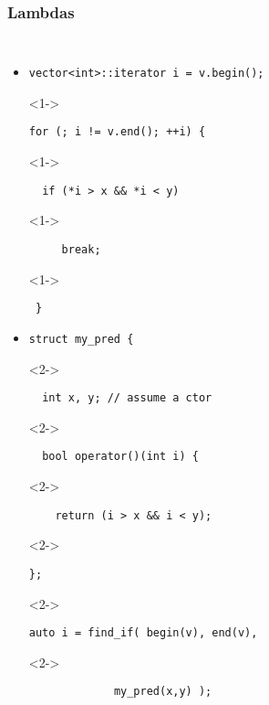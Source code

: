 
\begin{frame}[fragile]
\frametitle{Lambdas}
\begin{columns}[t]
\begin{itemize}
\item  <1->{\scriptsize\begin{verbatim}vector<int>::iterator i = v.begin();  \end{verbatim}}
\item[]<1->{\scriptsize\begin{verbatim}for (; i != v.end(); ++i) {\end{verbatim}}
\item[]<1->{\scriptsize\begin{verbatim}  if (*i > x && *i < y)    \end{verbatim}}
\item[]<1->{\scriptsize\begin{verbatim}     break;  \end{verbatim}}
\item[]<1->{\scriptsize\begin{verbatim} }   \end{verbatim}}
\vskip 6pt
\item  <2->{\scriptsize\begin{verbatim}struct my_pred {  \end{verbatim}}
\item[]<2->{\scriptsize\begin{verbatim}  int x, y; // assume a ctor\end{verbatim}}
\item[]<2->{\scriptsize\begin{verbatim}  bool operator()(int i) {   \end{verbatim}}
\item[]<2->{\scriptsize\begin{verbatim}    return (i > x && i < y); \end{verbatim}}
\item[]<2->{\scriptsize\begin{verbatim}}; \end{verbatim}}
\vskip 6pt
\item[]<2->{\scriptsize\begin{verbatim}auto i = find_if( begin(v), end(v), \end{verbatim}}
\item[]<2->{\scriptsize\begin{verbatim}             my_pred(x,y) );     \end{verbatim}}
\end{itemize}


\end{columns}
\end{frame}
